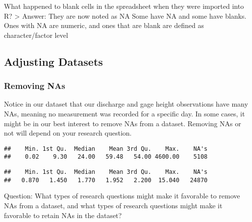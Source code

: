\documentclass[]{article}
\newenvironment{Shaded}{\begin{snugshade}}{\end{snugshade}}
\newcommand{\KeywordTok}[1]{\textcolor[rgb]{0.13,0.29,0.53}{\textbf{#1}}}
\newcommand{\NormalTok}[1]{#1}
\newcommand{\OperatorTok}[1]{\textcolor[rgb]{0.81,0.36,0.00}{\textbf{#1}}}
\begin{document}
What happened to blank cells in the spreadsheet when they were imported
into R? \textgreater{} Answer: They are now noted as NA Some have NA and
some have blanks. Ones with NA are numeric, and ones that are blank are
defined as character/factor level

\hypertarget{adjusting-datasets}{%
\subsection{Adjusting Datasets}\label{adjusting-datasets}}

\hypertarget{removing-nas}{%
\subsubsection{Removing NAs}\label{removing-nas}}

Notice in our dataset that our discharge and gage height observations
have many NAs, meaning no measurement was recorded for a specific day.
In some cases, it might be in our best interest to remove NAs from a
dataset. Removing NAs or not will depend on your research question.

\begin{Shaded}
\end{Shaded}

\begin{verbatim}
##    Min. 1st Qu.  Median    Mean 3rd Qu.    Max.    NA's 
##    0.02    9.30   24.00   59.48   54.00 4600.00    5108
\end{verbatim}

\begin{Shaded}
\end{Shaded}

\begin{verbatim}
##    Min. 1st Qu.  Median    Mean 3rd Qu.    Max.    NA's 
##   0.870   1.450   1.770   1.952   2.200  15.040   24870
\end{verbatim}

Question: What types of research questions might make it favorable to
remove NAs from a dataset, and what types of research questions might
make it favorable to retain NAs in the dataset?
\end{document}
